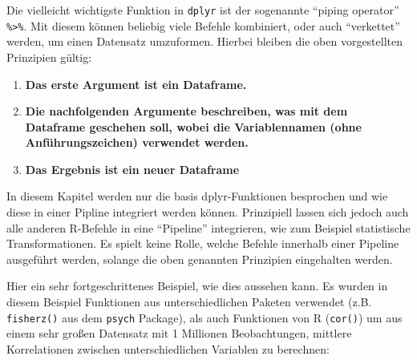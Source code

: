 \documentclass[
  ngerman,
]{book}
\begin{document}
Die vielleicht wichtigste Funktion in \texttt{dplyr} ist der sogenannte ``piping operator'' \texttt{\%\textgreater{}\%}. Mit diesem können beliebig viele Befehle kombiniert, oder auch ``verkettet'' werden, um einen Datensatz umzuformen. Hierbei bleiben die oben vorgestellten Prinzipien gültig:

\begin{enumerate}
\def\labelenumi{\arabic{enumi}.}
\item
  \textbf{Das erste Argument ist ein Dataframe.}
\item
  \textbf{Die nachfolgenden Argumente beschreiben, was mit dem Dataframe geschehen soll, wobei die Variablennamen (ohne Anführungszeichen) verwendet werden.}
\item
  \textbf{Das Ergebnis ist ein neuer Dataframe}
\end{enumerate}

In diesem Kapitel werden nur die basis dplyr-Funktionen besprochen und wie diese in einer Pipline integriert werden können. Prinzipiell lassen sich jedoch auch alle anderen R-Befehle in eine ``Pipeline'' integrieren, wie zum Beispiel statistische Transformationen. Es spielt keine Rolle, welche Befehle innerhalb einer Pipeline ausgeführt werden, solange die oben genannten Prinzipien eingehalten werden.

Hier ein sehr fortgeschrittenes Beispiel, wie dies aussehen kann. Es wurden in diesem Beispiel Funktionen aus unterschiedlichen Paketen verwendet (z.B. \texttt{fisherz()} aus dem \texttt{psych} Package), als auch Funktionen von R (\texttt{cor()}) um aus einem sehr großen Datensatz mit 1 Millionen Beobachtungen, mittlere Korrelationen zwischen unterschiedlichen Variablen zu berechnen:
\end{document}
